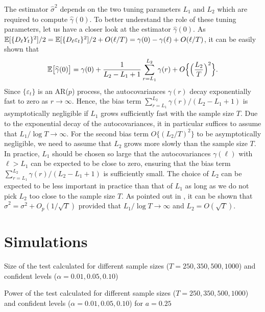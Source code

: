 \documentclass[a4paper,12pt]{article}
\numberwithin{equation}{section}
\begin{document}
The estimator $\widehat{\sigma}^2$ depends on the two tuning parameters $L_1$ and $L_2$ which are required to compute $\widehat{\gamma}(0)$. To better understand the role of these tuning parameters, let us have a closer look at the estimator $\widehat{\gamma}(0)$. As $\mathbb{E}[ \{ D_\ell Y_t \}^2 ]/2 = \mathbb{E}[ \{ D_\ell \varepsilon_t \}^2 ]/2 + O(\ell/T) = \gamma(0) - \gamma(\ell) + O(\ell/T)$, it can be easily shown that
\[ \mathbb{E}\big[\widehat{\gamma}(0)\big] = \gamma(0) + \frac{1}{L_2-L_1+1}\sum_{r=L_1}^{L_2} \gamma(r) + O\Big\{ \Big(\frac{L_2}{T} \Big)^2 \Big\}. \]
Since $\{ \varepsilon_t\}$ is an AR($p$) process, the autocovariances $\gamma(r)$ decay exponentially fast to zero as $r \rightarrow \infty$. Hence, the bias term $\sum_{r=L_1}^{L_2} \gamma(r) / (L_2-L_1+1)$ is asymptotically negligible if $L_1$ grows sufficiently fast with the sample size $T$. Due to the exponential decay of the autocovariances, it in particular suffices to assume that $L_1/\log T \rightarrow \infty$. For the second bias term  $O\{ (L_2/T)^2 \}$ to be asymptotically negligible, we need to assume that $L_2$ grows more slowly than the sample size $T$. In practice, $L_1$ should be chosen so large that the autocovariances $\gamma(\ell)$ with $\ell > L_1$ can be expected to be close to zero, ensuring that the bias term $\sum_{r=L_1}^{L_2} \gamma(r) / (L_2-L_1+1)$ is sufficiently small. The choice of $L_2$ can be expected to be less important in practice than that of $L_1$ as long as we do not pick $L_2$ too close to the sample size $T$. As pointed out in \cite{Hall2003}, it can be shown that $\widehat{\sigma}^2 = \sigma^2 + O_p(1/\sqrt{T})$ provided that $L_1/\log T \rightarrow \infty$ and $L_2 = O(\sqrt{T})$. 

\newpage
\section{Simulations}

\begin{table}[H]
    \begin{center}
        \caption{Size of the test calculated for different sample sizes ($T = 250, 350, 500, 1000$) and confident levels ($\alpha = 0.01, 0.05, 0.10$)}
        \label{tab:size}
        \centering
        
    \end{center}
\end{table}

\begin{table}[H]
    \begin{center}
        \caption{Power of the test calculated for different sample sizes ($T = 250, 350, 500, 1000$) and confident levels ($\alpha = 0.01, 0.05, 0.10$) for $a = 0.25$}
        \label{tab:power_025}
        \centering
        
    \end{center}
\end{table}
\end{document}
